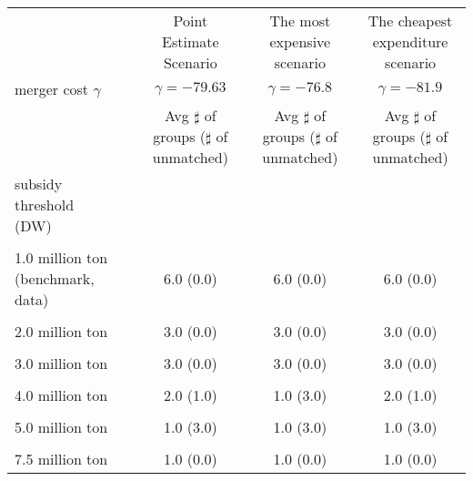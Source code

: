 \begin{tabular}{@{\extracolsep{5pt}}lcccc}
\toprule 
 &  & Point Estimate Scenario & The most expensive scenario & The cheapest expenditure scenario \\
merger cost $\gamma$ &  & $\gamma=-79.63$ & $\gamma=-76.8$ & $\gamma=-81.9$ \\
 &  & Avg $\sharp$ of groups ($\sharp$ of unmatched) & Avg $\sharp$ of groups ($\sharp$ of unmatched) & Avg $\sharp$ of groups ($\sharp$ of unmatched) \\
\midrule 
subsidy threshold (DW) &  &  &  &  \\
 &  &  &  &  \\
1.0 million ton (benchmark, data) &  & 6.0 (0.0) & 6.0 (0.0) & 6.0 (0.0) \\
 &  &  &  &  \\
2.0 million ton &  & 3.0 (0.0) & 3.0 (0.0) & 3.0 (0.0) \\
 &  &  &  &  \\
3.0 million ton &  & 3.0 (0.0) & 3.0 (0.0) & 3.0 (0.0) \\
 &  &  &  &  \\
4.0 million ton &  & 2.0 (1.0) & 1.0 (3.0) & 2.0 (1.0) \\
 &  &  &  &  \\
5.0 million ton &  & 1.0 (3.0) & 1.0 (3.0) & 1.0 (3.0) \\
 &  &  &  &  \\
7.5 million ton &  & 1.0 (0.0) & 1.0 (0.0) & 1.0 (0.0) \\
\hline 
\bottomrule 
\end{tabular}
